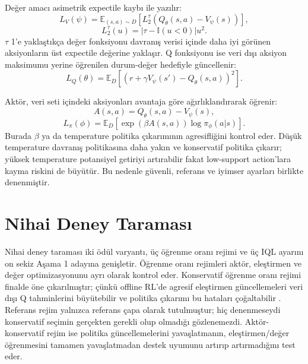 \documentclass[conference]{IEEEtran}
\begin{document}
Değer amacı asimetrik expectile kaybı ile yazılır:
\begin{equation}
L_V(\psi)=\mathbb{E}_{(s,a)\sim D}\left[L_2^\tau(Q_\theta(s,a)-V_\psi(s))\right],
\end{equation}
\begin{equation}
L_2^\tau(u)=|\tau-\mathbb{I}(u<0)|u^2.
\end{equation}
$\tau$ 1'e yaklaştıkça değer fonksiyonu davranış verisi içinde daha iyi görünen aksiyonların üst expectile değerine yaklaşır. Q fonksiyonu ise veri dışı aksiyon maksimumu yerine öğrenilen durum-değer hedefiyle güncellenir:
\begin{equation}
L_Q(\theta)=\mathbb{E}_{D}\left[(r+\gamma V_\psi(s')-Q_\theta(s,a))^2\right].
\end{equation}

Aktör, veri seti içindeki aksiyonları avantaja göre ağırlıklandırarak öğrenir:
\begin{equation}
A(s,a)=Q_\theta(s,a)-V_\psi(s),
\end{equation}
\begin{equation}
L_\pi(\phi)=\mathbb{E}_{D}\left[\exp(\beta A(s,a))\log \pi_\phi(a|s)\right].
\end{equation}
Burada $\beta$ ya da temperature politika çıkarımının agresifliğini kontrol eder. Düşük temperature davranış politikasına daha yakın ve konservatif politika çıkarır; yüksek temperature potansiyel getiriyi artırabilir fakat low-support action'lara kayma riskini de büyütür. Bu nedenle güvenli, referans ve iyimser ayarları birlikte denenmiştir.

\section{Nihai Deney Taraması}
Nihai deney taraması iki ödül varyantı, üç öğrenme oranı rejimi ve üç IQL ayarını on sekiz Aşama 1 adayına genişletir. Öğrenme oranı rejimleri aktör, eleştirmen ve değer optimizasyonunu ayrı olarak kontrol eder. Konservatif öğrenme oranı rejimi finalde öne çıkarılmıştır; çünkü offline RL'de agresif eleştirmen güncellemeleri veri dışı Q tahminlerini büyütebilir ve politika çıkarımı bu hataları çoğaltabilir \cite{cql,iql}. Referans rejim yalnızca referans çapa olarak tutulmuştur; hiç denenmeseydi konservatif seçimin gerçekten gerekli olup olmadığı gözlenemezdi. Aktör-konservatif rejim ise politika güncellemelerini yavaşlatmanın, eleştirmen/değer öğrenmesini tamamen yavaşlatmadan destek uyumunu artırıp artırmadığını test eder.
\end{document}
